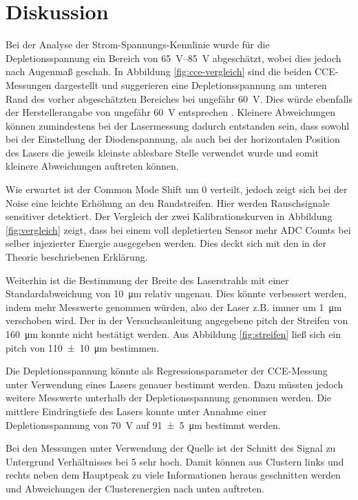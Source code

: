 \section{Diskussion}
\label{sec:Diskussion}

Bei der Analyse der Strom-Spannungs-Kennlinie wurde für die Depletionsspannung ein
Bereich von \SIrange{65}{85}{\volt} abgeschätzt, wobei dies jedoch nach Augenmaß
geschah. In Abbildung \ref{fig:cce-vergleich} sind die beiden CCE-Messungen dargestellt
und suggerieren eine Depletionsspannung am unteren Rand des vorher abgeschätzten Bereiches
bei ungefähr \SI{60}{\volt}.
Dies würde ebenfalls der Herstellerangabe von ungefähr \SI{60}{\volt} entsprechen \cite{alibava}.
Kleinere Abweichungen können zumindestens bei der Lasermessung dadurch entstanden sein,
dass sowohl bei der Einstellung der Diodenspannung, als auch bei der horizontalen
Position des Lasers die jeweils kleinste ablesbare Stelle verwendet wurde und somit
kleinere Abweichungen auftreten können.

Wie erwartet ist der Common Mode Shift um \num{0} verteilt, jedoch zeigt sich bei
der Noise eine leichte Erhöhung an den Randstreifen. Hier werden Rauschsignale
sensitiver detektiert.
Der Vergleich der zwei Kalibrationskurven in Abbildung \ref{fig:vergleich} zeigt,
dass bei einem voll depletierten Sensor mehr ADC Counts bei selber injezierter
Energie ausgegeben werden. Dies deckt sich mit den in der Theorie beschriebenen
Erklärung.

Weiterhin ist die Bestimmung der Breite des Laserstrahls mit einer Standardabweichung
von \SI{10}{\micro\meter} relativ ungenau. Dies könnte verbessert werden, indem
mehr Messwerte genommen würden, also der Laser z.B. immer um \SI{1}{\micro\meter}
verschoben wird.
Der in der Versuchsanleitung angegebene pitch der Streifen von \SI{160}{\micro\meter}
\cite[13]{anleitung} konnte nicht bestätigt werden. Aus Abbildung \ref{fig:streifen}
ließ sich ein pitch von \SI{110(10)}{\micro\meter} bestimmen.

Die Depletionsspannung könnte als Regressionsparameter der CCE-Messung unter Verwendung
eines Lasers genauer bestimmt werden. Dazu müssten jedoch weitere Messwerte
unterhalb der Depletionsspannung genommen werden.
Die mittlere Eindringtiefe des Lasers konnte unter Annahme einer Depletionsspannung
von \SI{70}{\volt} auf \SI{91(5)}{\micro\meter} bestimmt werden.

Bei den Messungen unter Verwendung der Quelle ist der Schnitt des Signal zu Untergrund
Verhältnisses bei \num{5} sehr hoch. Damit können aus Clustern links und rechts neben dem
Hauptpeak zu viele Informationen heraus geschnitten werden und Abweichungen der
Clusterenergien nach unten auftreten.
